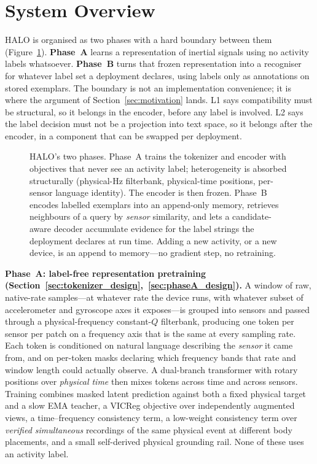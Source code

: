 \section{System Overview}
\label{sec:overview}

HALO is organised as two phases with a hard boundary between them
(Figure~\ref{fig:overview}). \textbf{Phase~A} learns a representation of inertial signals
using no activity labels whatsoever. \textbf{Phase~B} turns that frozen representation into a
recogniser for whatever label set a deployment declares, using labels only as annotations on
stored exemplars. The boundary is not an implementation convenience; it is where the argument
of Section~\ref{sec:motivation} lands. L1 says compatibility must be structural, so it belongs
in the encoder, before any label is involved. L2 says the label decision must not be a
projection into text space, so it belongs after the encoder, in a component that can be swapped
per deployment.

\begin{figure}[t]
    \centering
    \setlength{\abovecaptionskip}{4pt}
    \setlength{\belowcaptionskip}{-4pt}
  
  \caption{HALO's two phases. Phase~A trains the tokenizer and encoder with objectives that
  never see an activity label; heterogeneity is absorbed structurally (physical-Hz filterbank,
  physical-time positions, per-sensor language identity). The encoder is then frozen. Phase~B
  encodes labelled exemplars into an append-only memory, retrieves neighbours of a query by
  \emph{sensor} similarity, and lets a candidate-aware decoder accumulate evidence for the label
  strings the deployment declares at run time. Adding a new activity, or a new device, is an
  append to memory---no gradient step, no retraining.}
  \label{fig:overview}
\end{figure}

\textbf{Phase~A: label-free representation pretraining
(Section~\ref{sec:tokenizer_design},~\ref{sec:phaseA_design}).}
A window of raw, native-rate samples---at whatever rate the device runs, with whatever subset of
accelerometer and gyroscope axes it exposes---is grouped into sensors and passed through a
physical-frequency constant-$Q$ filterbank, producing one token per sensor per patch on a
frequency axis that is the same at every sampling rate. Each token is conditioned on natural
language describing the \emph{sensor} it came from, and on per-token masks declaring which
frequency bands that rate and window length could actually observe. A dual-branch transformer
with rotary positions over \emph{physical time} then mixes tokens across time and across
sensors. Training combines masked latent prediction against both a fixed physical target and a
slow EMA teacher, a VICReg objective over independently augmented views, a time--frequency
consistency term, a low-weight consistency term over \emph{verified simultaneous} recordings of
the same physical event at different body placements, and a small self-derived physical
grounding rail. None of these uses an activity label.

